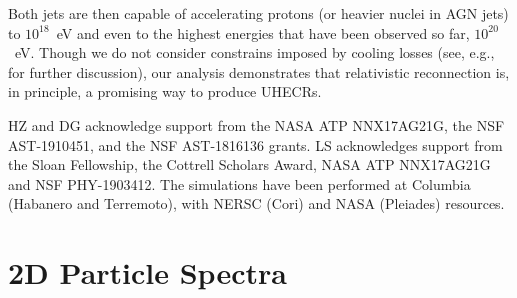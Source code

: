 \documentclass[twocolumn,twocolappendix]{aastex63}
\begin{document}
Both jets are then capable of accelerating protons (or heavier nuclei in AGN jets) to $10^{18}$~eV and even to the highest energies that have been observed so far, $10^{20}$~eV. Though we do not consider constrains imposed by cooling losses (see, e.g., \citet{giannios_10} for further discussion), our analysis demonstrates that relativistic reconnection is, in principle, a promising way to produce UHECRs.



\acknowledgements
HZ and DG acknowledge support from the NASA ATP NNX17AG21G, the NSF AST-1910451, and the NSF AST-1816136 grants. LS acknowledges support from the Sloan Fellowship, the Cottrell Scholars Award, NASA ATP NNX17AG21G and NSF PHY-1903412. The simulations have been performed at Columbia (Habanero and Terremoto), with NERSC (Cori) and NASA (Pleiades) resources.




\appendix

\section{2D Particle Spectra}\label{appd}
\end{document}
